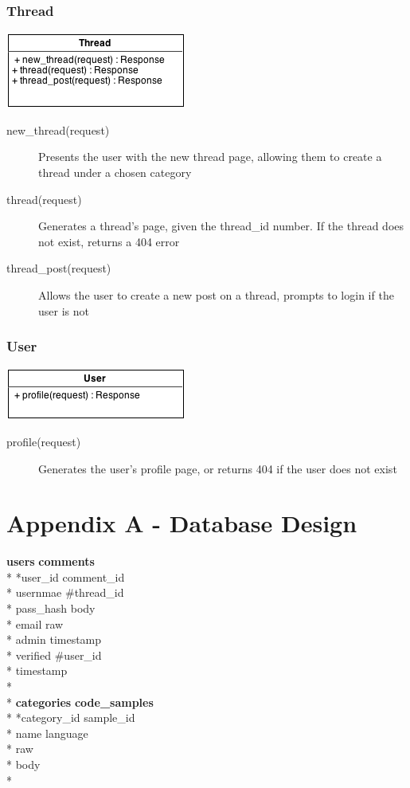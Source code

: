 \documentclass[12pt]{scrartcl}
\begin{document}
\subsubsection{Thread}
\includegraphics[keepaspectratio]{umls/thread_uml.png}
\begin{description}
\item [new\_thread(request)] Presents the user with the new thread page, allowing them to create a thread under a chosen category
\item [thread(request)] Generates a thread’s page, given the thread\_id number. If the thread does not exist, returns a 404 error
\item [thread\_post(request)] Allows the user to create a new post on a thread, prompts to login if the user is not
\end{description}

\subsubsection{User}
\includegraphics[keepaspectratio]{umls/user_uml.png}
\begin{description}
\item [profile(request)] Generates the user’s profile page, or returns 404 if the user does not exist
\end{description}

\section{Appendix A - Database Design}

\textbf{users} \hfill \textbf{comments}\\*
*user\_id \hfill *comment\_id\\*
usernmae \hfill \#thread\_id\\*
pass\_hash \hfill body\\*
email \hfill raw\\*
admin \hfill timestamp\\*
verified \hfill \#user\_id\\*
timestamp \\*
\\*
\textbf{categories} \hfill \textbf{code\_samples}\\*
*category\_id \hfill *sample\_id\\*
name \hfill language\\*
\hfill raw\\*
\hfill body\\*
\end{document}
